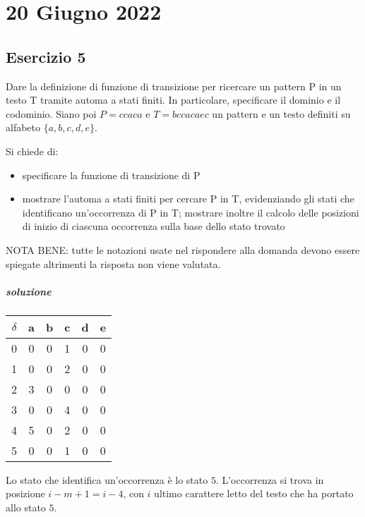 \chapter{20 Giugno 2022}

\section{Esercizio 5}

Dare la definizione di funzione di transizione per ricercare un pattern P in un testo T tramite automa a stati finiti. In particolare, specificare il dominio e il codominio.
Siano poi $P=ccaca$ e $T=bccacaec$ un pattern e un testo definiti su alfabeto $\{a, b, c, d, e\}$.

Si chiede di:
\begin{itemize}
    \item specificare la funzione di transizione di P
    \item mostrare l'automa a stati finiti per cercare P in T, evidenziando gli stati che identificano un'occorrenza di P in T; mostrare inoltre il calcolo delle posizioni di inizio di ciascuna occorrenza sulla base dello stato trovato
\end{itemize}

NOTA BENE: tutte le notazioni usate nel rispondere alla domanda devono essere spiegate altrimenti la risposta non viene valutata.

\paragraph{soluzione}

\begin{center}
  \begin{tabular}{|c c c c c c|}
    $\delta$ & a & b & c & d & e \\ \hline
    0 & 0 & 0 & 1 & 0 & 0 \\ \hline
    1 & 0 & 0 & 2 & 0 & 0 \\ \hline
    2 & 3 & 0 & 0 & 0 & 0 \\ \hline
    3 & 0 & 0 & 4 & 0 & 0 \\ \hline
    4 & 5 & 0 & 2 & 0 & 0 \\ \hline
    5 & 0 & 0 & 1 & 0 & 0 \\ \hline
  \end{tabular}
\end{center}

Lo stato che identifica un'occorrenza \`e lo stato $5$. L'occorrenza si trova in posizione $i - m + 1 = i - 4$, con $i$ ultimo carattere letto del testo che ha portato allo stato $5$.

